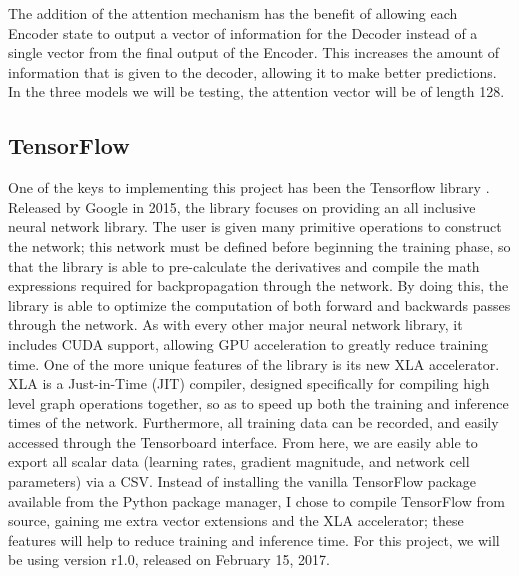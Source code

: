 \documentclass[pageno]{jpaper}
\begin{document}
The addition of the attention mechanism has the benefit of allowing each Encoder state to output a vector of information for the Decoder instead of a single vector from the final output of the Encoder.  This increases the amount of information that is given to the decoder, allowing it to make better predictions.  In the three models we will be testing, the attention vector will be of length 128.

\subsection{TensorFlow}
One of the keys to implementing this project has been the Tensorflow library \cite{tensorflow:2015}.  Released by Google in 2015, the library focuses on providing an all inclusive neural network library.  The user is given many primitive operations to construct the network; this network must be defined before beginning the training phase, so that the library is able to pre-calculate the derivatives and compile the math expressions required for backpropagation through the network.  By doing this, the library is able to optimize the computation of both forward and backwards passes through the network.  As with every other major neural network library, it includes CUDA support, allowing GPU acceleration to greatly reduce training time.  One of the more unique features of the library is its new XLA accelerator.  XLA is a Just-in-Time (JIT) compiler, designed specifically for compiling high level graph operations together, so as to speed up both the training and inference times of the network.  Furthermore, all training data can be recorded, and easily accessed through the Tensorboard interface.  From here, we are easily able to export all scalar data (learning rates, gradient magnitude, and network cell parameters) via a CSV.  Instead of installing the vanilla TensorFlow package available from the Python package manager, I chose to compile TensorFlow from source, gaining me extra vector extensions and the XLA accelerator; these features will help to reduce training and inference time.  For this project, we will be using version r1.0, released on February 15, 2017.
\end{document}
